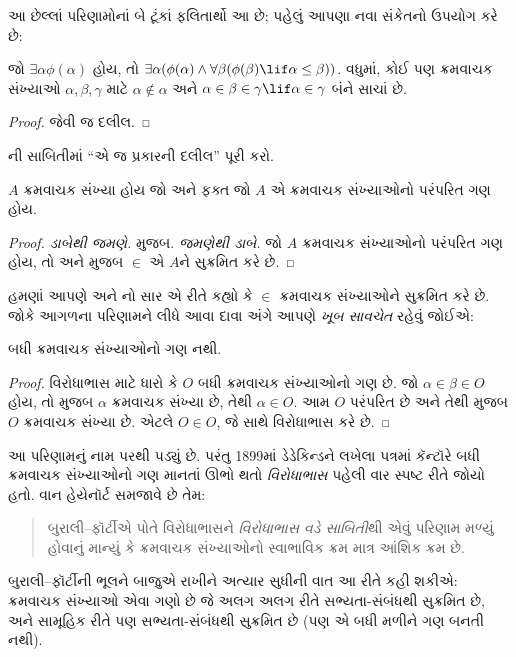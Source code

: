 \documentclass[../../../include/open-logic-section]{subfiles}
\begin{document}
આ છેલ્લાં પરિણામોનાં બે ટૂંકાં ફલિતાર્થો
આ છે; પહેલું આપણા નવા સંકેતનો ઉપયોગ કરે છે:

\begin{cor}
જો $\exists \alpha\phi(\alpha)$ હોય, તો
$\exists \alpha(\phi(\alpha)
\land \forall \beta(\phi(\beta) \lif \alpha \leq \beta))$.
વધુમાં, કોઈ પણ ક્રમવાચક સંખ્યાઓ
$\alpha, \beta, \gamma$ માટે
$\alpha
\notin \alpha$ અને
$\alpha \in \beta \in \gamma \lif \alpha \in
\gamma$ બંને સાચાં છે.
\end{cor}

\begin{proof}
 જેવી જ દલીલ.
\end{proof}

\begin{prob}
ની
સાબિતીમાં “એ જ પ્રકારની દલીલ” પૂરી કરો.
\end{prob}

\begin{cor}
$A$ ક્રમવાચક સંખ્યા હોય જો અને ફક્ત જો
$A$ એ ક્રમવાચક સંખ્યાઓનો પરંપરિત ગણ હોય.
\end{cor}

\begin{proof}
\emph{ડાબેથી જમણે.}  મુજબ.
\emph{જમણેથી ડાબે.}
જો $A$ ક્રમવાચક સંખ્યાઓનો પરંપરિત
ગણ હોય, તો
 અને
 મુજબ
$\in$ એ $A$ને સુક્રમિત કરે છે.
\end{proof}

હમણાં આપણે 
અને નો સાર એ રીતે
કહ્યો કે $\in$ ક્રમવાચક સંખ્યાઓને
સુક્રમિત કરે છે. જોકે આગળના પરિણામને
લીધે આવા દાવા અંગે આપણે \emph{ખૂબ સાવચેત}
રહેવું જોઈએ:

\begin{thm}[બુરાલી–ફૉર્ટીનો વિરોધાભાસ]
બધી ક્રમવાચક સંખ્યાઓનો ગણ નથી.
\end{thm}

\begin{proof}
વિરોધાભાસ માટે ધારો કે $O$ બધી
ક્રમવાચક સંખ્યાઓનો ગણ છે.
જો $\alpha \in
\beta \in O$ હોય, તો
 મુજબ $\alpha$
ક્રમવાચક સંખ્યા છે, તેથી
$\alpha \in O$.
આમ $O$ પરંપરિત છે અને તેથી
 મુજબ
$O$ ક્રમવાચક સંખ્યા છે.
એટલે $O \in O$, જે
 સાથે વિરોધાભાસ કરે છે.
\end{proof}
\noindent
આ પરિણામનું નામ \citeauthor{Burali-Forti1897}
પરથી પડ્યું છે. પરંતુ 1899માં ડેડેકિન્ડને
લખેલા પત્રમાં કૅન્ટૉરે બધી ક્રમવાચક
સંખ્યાઓનો ગણ માનતાં ઊભો થતો
\emph{વિરોધાભાસ} પહેલી વાર સ્પષ્ટ રીતે
જોયો હતો. વાન હેયેનૉર્ટ સમજાવે છે તેમ:
\begin{quote}
  બુરાલી–ફૉર્ટીએ પોતે વિરોધાભાસને
  \emph{વિરોધાભાસ વડે સાબિતી}થી
  એવું પરિણામ મળ્યું હોવાનું માન્યું કે
  ક્રમવાચક સંખ્યાઓનો સ્વાભાવિક ક્રમ
  માત્ર આંશિક ક્રમ છે.
  \citep[p.~105]{Heijenoort1967}
\end{quote}
બુરાલી–ફૉર્ટીની ભૂલને બાજુએ રાખીને
અત્યાર સુધીની વાત આ રીતે કહી શકીએ:
ક્રમવાચક સંખ્યાઓ એવા ગણો છે જે
અલગ અલગ રીતે સભ્યતા-સંબંધથી
સુક્રમિત છે, અને સામૂહિક રીતે પણ
સભ્યતા-સંબંધથી સુક્રમિત છે
(પણ એ બધી મળીને ગણ બનતી નથી).
\end{document}

